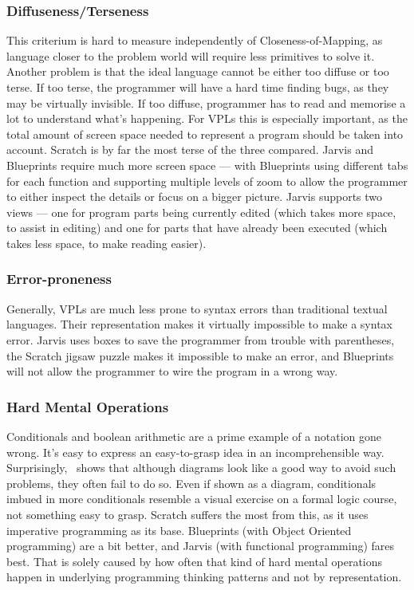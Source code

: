 \documentclass[11pt]{scrartcl}
\begin{document}
\subsubsection{Diffuseness/Terseness}
This criterium is hard to measure independently of Closeness-of-Mapping, as
language closer to the problem world will require less primitives to solve it.
Another problem is that the ideal language cannot be either too diffuse or too
terse.
If too terse, the programmer will have a hard time finding bugs, as they may be
virtually invisible.
If too diffuse, programmer has to read and memorise a lot to understand what’s
happening.
For VPLs this is especially important, as the total amount of screen space
needed to represent a program should be taken into account.
Scratch is by far the most terse of the three compared.
Jarvis and Blueprints require much more screen space --- with Blueprints using
different tabs for each function and supporting multiple levels of zoom to allow
the programmer to either inspect the details or focus on a bigger picture.
Jarvis supports two views --- one for program parts being currently edited (which
takes more space, to assist in editing) and one for parts that have already been
executed (which takes less space, to make reading easier).

\subsubsection{Error-proneness}
Generally, VPLs are much less prone to syntax errors than traditional textual
languages.
Their representation makes it virtually impossible to make a syntax error.
Jarvis uses boxes to save the programmer from trouble with parentheses, the
Scratch jigsaw puzzle makes it impossible to make an error, and Blueprints will
not allow the programmer to wire the program in a wrong way.

\subsubsection{Hard Mental Operations}
Conditionals and boolean arithmetic are a prime example of a notation gone
wrong.
It’s easy to express an easy-to-grasp idea in an incomprehensible way.
Surprisingly,~\cite{Green96UsabilityAnalysis} shows that although diagrams look
like a good way to avoid such problems, they often fail to do so.
Even if shown as a diagram, conditionals imbued in more conditionals resemble a
visual exercise on a formal logic course, not something easy to grasp.
Scratch suffers the most from this, as it uses imperative programming as its
base.
Blueprints (with Object Oriented programming) are a bit better, and Jarvis (with
functional programming) fares best.
That is solely caused by how often that kind of hard mental operations happen in
underlying programming thinking patterns and not by representation.
\end{document}
